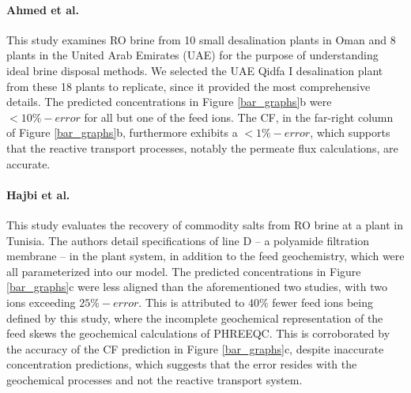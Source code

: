 \paragraph{Ahmed et al.\cite{Ahmed2001BrineEmirates}}
This study examines RO brine from 10 small desalination plants in Oman and 8 plants in the United Arab Emirates (UAE) for the purpose of understanding ideal brine disposal methods. We selected the UAE Qidfa I desalination plant from these 18 plants to replicate, since it provided the most comprehensive details. The predicted concentrations in Figure \ref{bar_graphs}b were $<10\%-error$ for all but one of the feed ions. The CF, in the far-right column of Figure \ref{bar_graphs}b, furthermore exhibits a $<1\%-error$, which supports that the reactive transport processes, notably the permeate flux calculations, are accurate.

\paragraph{Hajbi et al.\cite{Hajbi2010ReuseBrine}}
This study  evaluates the recovery of commodity salts from RO brine at a plant in Tunisia. The authors detail specifications of line D -- a polyamide filtration membrane -- in the plant system, in addition to the feed geochemistry, which were all parameterized into our model. The predicted concentrations in Figure \ref{bar_graphs}c were less aligned than the aforementioned two studies, with two ions exceeding $25\%-error$. This is attributed to $40\%$ fewer feed ions being defined by this study, where the incomplete geochemical representation of the feed skews the geochemical calculations of PHREEQC. This is corroborated by the accuracy of the CF prediction in Figure \ref{bar_graphs}c, despite inaccurate concentration predictions, which suggests that the error resides with the geochemical processes and not the reactive transport system. 

